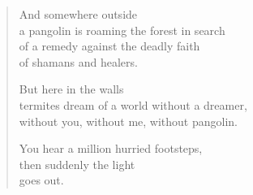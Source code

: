 \clearpage

\begin{verse}
And somewhere outside\\
a pangolin is roaming the forest in search\\
of a remedy against the deadly faith\\
of shamans and healers.

But here in the walls\\
termites dream of a world without a dreamer,\\
without you, without me, without pangolin.

You hear a million hurried footsteps,\\
then suddenly the light\\
goes out.

\end{verse}
